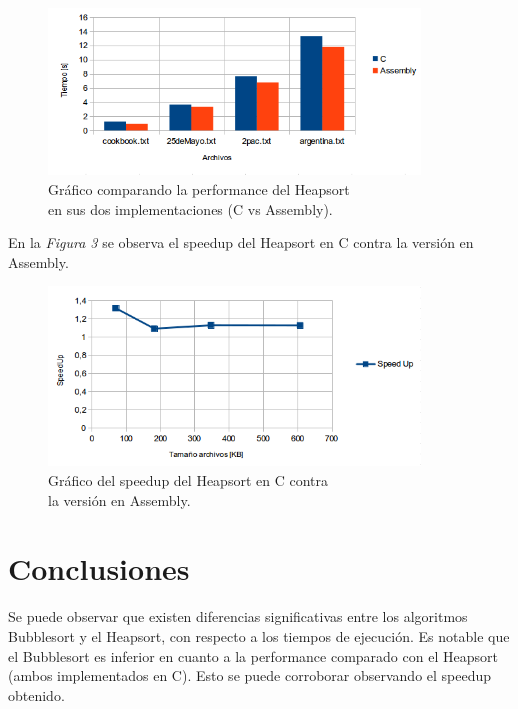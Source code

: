 \documentclass{article}
\begin{document}
	\begin{figure}[H]
	\centering
	\includegraphics[width=0.88\textwidth]{images/CvsMips.png}
	\medskip
		\caption{Gráfico comparando la performance del Heapsort\\ en sus dos implementaciones (C vs Assembly).}
	\end{figure}
	\bigskip\bigskip\bigskip


	En la \textit{Figura 3} se observa el speedup del Heapsort en C contra la versión en Assembly.
	\bigskip


	\begin{figure}[H]
		\centering
		\includegraphics[width=0.88\textwidth]{images/SpeedUpCvsAssembly.png}
		\medskip
		\caption{Gráfico del speedup del Heapsort en C contra\\ la versión en Assembly.}
	\end{figure}
	\bigskip\bigskip


\section{Conclusiones}

	Se puede observar que existen diferencias significativas entre los algoritmos Bubblesort y el Heapsort, con respecto a los tiempos de ejecución. Es notable que el Bubblesort es inferior en cuanto a la performance comparado con el Heapsort (ambos implementados en C). Esto se puede corroborar observando el speedup obtenido.
\end{document}
